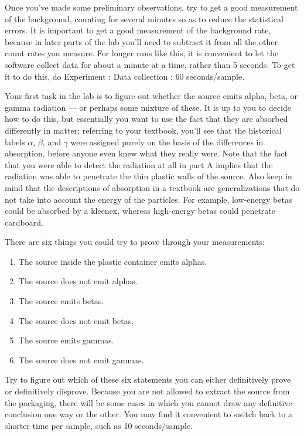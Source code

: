 Once you've made some preliminary observations, try to get a good measurement of
the background, counting for several minutes so as to reduce the statistical errors.
It is important to get a good measurement of the background rate, because in later
parts of the lab you'll need to subtract it from all the other count rates you measure.
For longer runs like this, it is convenient to let the software collect data for about a minute
at a time, rather than 5 seconds. To get it to do this, do Experiment : Data collection : 60 seconds/sample.


Your first task in the lab is to figure out whether the source emits
alpha, beta, or gamma radiation --- or perhaps some mixture of these.
It is up to you to decide how to do this, but essentially you want to
use the fact that they are absorbed differently in matter; referring
to your textbook, you'll see that the historical labels $\alpha$, $\beta$, and $\gamma$ were assigned
purely on the basis of the differences in absorption, before anyone even knew what they
really were. Note that the fact that you were able to detect the radiation
at all in part A implies that the radiation was able to penetrate the thin
plastic walls of the source. Also keep in mind that the descriptions of absorption
in a textbook are generalizations that do not take into account the energy of the
particles. For example, low-energy betas could be absorbed by a kleenex, whereas
high-energy betas could penetrate cardboard.

There are six things you could try to prove through your measurements:
\begin{enumerate}
\item The source inside the plastic container emits alphas.
\item The source does not emit alphas.
\item The source emits betas.
\item The source does not emit betas.
\item The source emits gammas.
\item The source does not emit gammas.
\end{enumerate}

Try to figure out which of these six statements you can either definitively prove or
definitively disprove. Because you are not allowed to extract the source from the packaging,
there will be some cases in which you cannot draw any definitive conclusion one way or the other.
You may find it convenient to switch back to a shorter time per sample, such as 10 seconds/sample.

